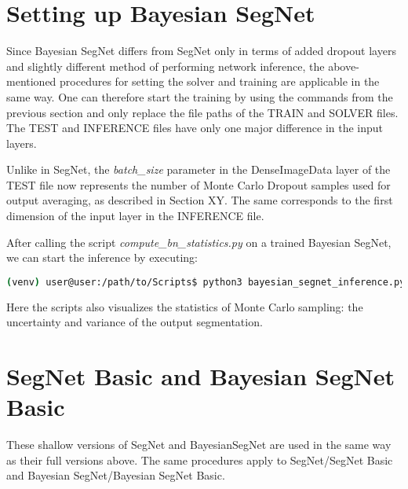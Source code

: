 \section{Setting up Bayesian SegNet}

Since Bayesian SegNet differs from SegNet only in terms of added dropout layers and slightly different method of performing network inference, the above-mentioned procedures for setting the solver and training are applicable in the same way. One can therefore start the training by using the commands from the previous section and only replace the file paths of the TRAIN and SOLVER files. The TEST and INFERENCE files have only one major difference in the input layers. 

Unlike in SegNet, the \textit{batch\_size} parameter in the DenseImageData layer of the TEST file now represents the number of Monte Carlo Dropout samples used for output averaging, as described in Section XY. The same corresponds to the first dimension of the input layer in the INFERENCE file.

After calling the script \textit{compute\_bn\_statistics.py} on a trained Bayesian SegNet, we can start the inference by executing:

\begin{lstlisting}[language=bash]
(venv) user@user:/path/to/Scripts$ python3 bayesian_segnet_inference.py /path/to/inference.prototxt /path/to/final_weights.caffemodel /path/to/videofile.avi 
\end{lstlisting}

Here the scripts also visualizes the statistics of Monte Carlo sampling: the uncertainty and variance of the output segmentation.

\section{SegNet Basic and Bayesian SegNet Basic}

These shallow versions of SegNet and BayesianSegNet are used in the same way as their full versions above. The same procedures apply to SegNet/SegNet Basic and Bayesian SegNet/Bayesian SegNet Basic.